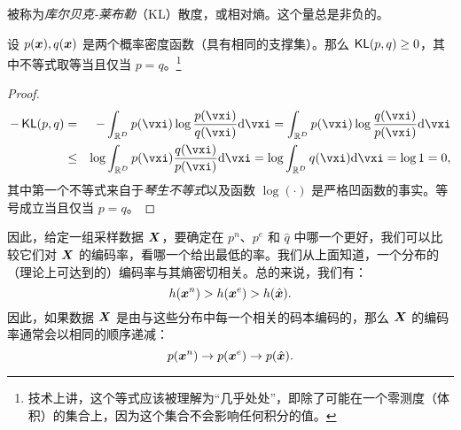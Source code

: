 \documentclass[../../book-main_zh.tex]{subfiles}
\begin{document}
被称为{\em 库尔贝克-莱布勒}（KL）散度，或相对熵。这个量总是非负的。
\begin{theorem}[信息不等式]\label{thm:information-inequality}
	设 $p(\bm{x}), q(\bm{x})$ 是两个概率密度函数（具有相同的支撑集）。那么 $\operatorname{\mathsf{KL}}(p, q) \ge 0$，其中不等式取等当且仅当 $p = q$。\footnote{技术上讲，这个等式应该被理解为“几乎处处”，即除了可能在一个零测度（体积）的集合上，因为这个集合不会影响任何积分的值。}
\end{theorem}
\begin{proof}
	\begin{eqnarray*}
		- \KL(p, q)
		&=& - \int_{\R^{D}} p(\vxi) \log \frac{p(\vxi)}{q(\vxi)} \odif{\vxi}
		=  \int_{\R^{D}} p(\vxi) \log \frac{q(\vxi)}{p(\vxi)} \odif{\vxi} \\
		&\le& \log \int_{\R^{D}} p(\vxi)  \frac{q(\vxi)}{p(\vxi)} \odif{\vxi} \label{eqn:jensen-KL}
		= \log \int_{\R^{D}} q(\vxi) \odif{\vxi} = \log 1 = 0,
	\end{eqnarray*}
	其中第一个不等式来自于{\em 琴生不等式}以及函数 $\log(\cdot)$ 是严格凹函数的事实。等号成立当且仅当 $p = q$。
\end{proof}

因此，给定一组采样数据 $\bm{X}$，要确定在 $p^{n}$、$p^{e}$ 和 $\hat{q}$ 中哪一个更好，我们可以比较它们对 $\bm{X}$ 的编码率，看哪一个给出最低的率。我们从上面知道，一个分布的（理论上可达到的）编码率与其熵密切相关。总的来说，我们有：
\begin{equation}
	h(\bm{x}^n) > h(\bm{x}^e) > h(\hat {\bm{x}}).
\end{equation}
因此，如果数据 $\bm{X}$ 是由与这些分布中每一个相关的码本编码的，那么 $\bm{X}$ 的编码率通常会以相同的顺序递减：
\begin{equation}
	p(\bm{x}^n) \rightarrow p(\bm{x}^e) \rightarrow p(\hat {\bm{x}}).
\end{equation}
\end{document}

